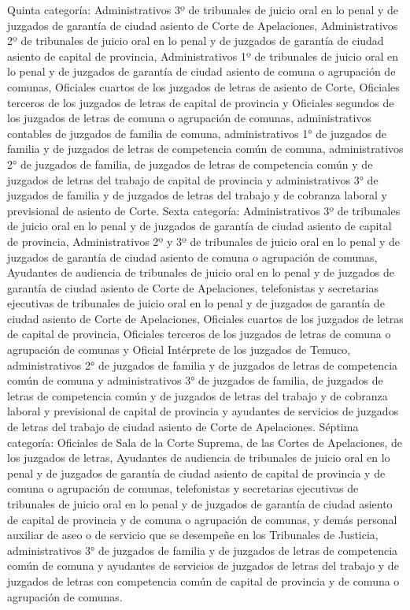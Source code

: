     Quinta categoría: Administrativos 3º de tribunales de juicio oral en lo penal y de juzgados de garantía de ciudad asiento de Corte de Apelaciones, Administrativos 2º de tribunales de juicio oral en lo penal y de juzgados de garantía de ciudad asiento de capital de provincia, Administrativos 1º de tribunales de juicio oral en lo penal y de juzgados de garantía de ciudad asiento de comuna o agrupación de comunas, Oficiales cuartos de los juzgados de letras de asiento de Corte, Oficiales terceros de los juzgados de letras de capital de provincia y Oficiales segundos de los juzgados de letras de comuna o agrupación de comunas, administrativos contables de juzgados de familia de comuna, administrativos 1° de juzgados de familia y de juzgados de letras de competencia común de comuna, administrativos 2° de juzgados de familia, de juzgados de letras de competencia común y de juzgados de letras del trabajo de capital de provincia y administrativos 3° de juzgados de familia y de juzgados de letras del trabajo y de cobranza laboral y previsional de asiento de Corte.
    Sexta categoría: Administrativos 3º de tribunales de juicio oral en lo penal y de juzgados de garantía de ciudad asiento de capital de provincia, Administrativos 2º y 3º de tribunales de juicio oral en lo penal y de juzgados de garantía de ciudad asiento de comuna o agrupación de comunas, Ayudantes de audiencia de tribunales de juicio oral en lo penal y de juzgados de garantía de ciudad asiento de Corte de Apelaciones, telefonistas y secretarias ejecutivas de tribunales de juicio oral en lo penal y de juzgados de garantía de ciudad asiento de Corte de Apelaciones, Oficiales cuartos de los juzgados de letras de capital de provincia, Oficiales terceros de los juzgados de letras de comuna o agrupación de comunas y Oficial Intérprete de los juzgados de Temuco, administrativos 2° de juzgados de familia y de juzgados de letras de competencia común de comuna y administrativos 3° de juzgados de familia, de juzgados de letras de competencia común y de juzgados de letras del trabajo y de cobranza laboral y previsional de capital de provincia y ayudantes de servicios de juzgados de letras del trabajo de ciudad asiento de Corte de Apelaciones.
    Séptima categoría: Oficiales de Sala de la Corte Suprema, de las Cortes de Apelaciones, de los juzgados de letras, Ayudantes de audiencia de tribunales de juicio oral en lo penal y de juzgados de garantía de ciudad asiento de capital de provincia y de comuna o agrupación de comunas, telefonistas y secretarias ejecutivas de tribunales de juicio oral en lo penal y de juzgados de garantía de ciudad asiento de capital de provincia y de comuna o agrupación de comunas, y demás personal auxiliar de aseo o de servicio que se desempeñe en los Tribunales de Justicia, administrativos 3° de juzgados de familia y de juzgados de letras de competencia común de comuna y ayudantes de servicios de juzgados de letras del trabajo y de juzgados de letras con competencia común de capital de provincia y de comuna o agrupación de comunas.


